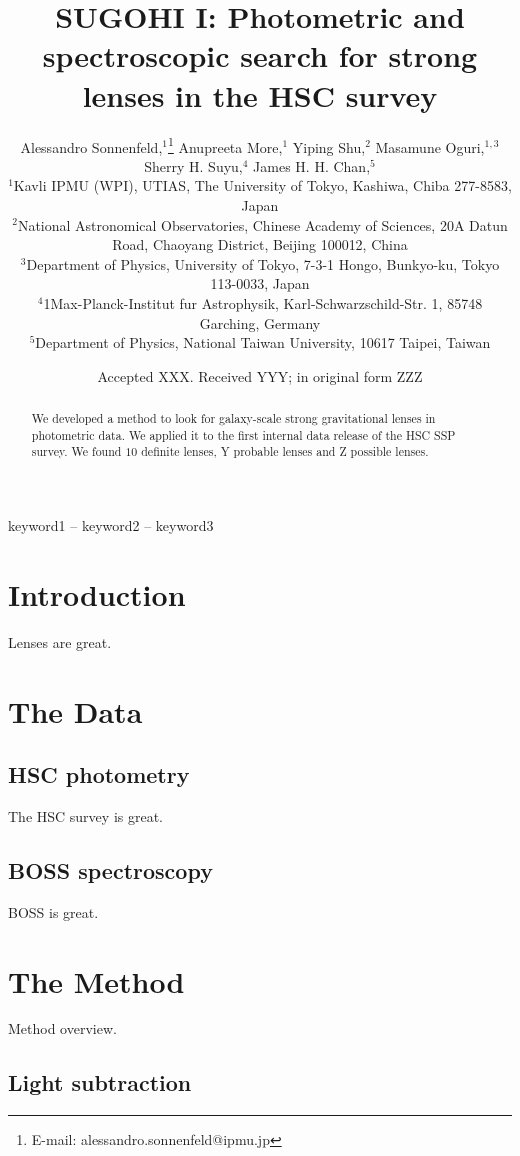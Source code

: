 \documentclass[a4paper,fleqn,usenatbib]{mnras}
\title[]{SUGOHI I: Photometric and spectroscopic search for strong lenses in the HSC survey}
\author[A. Sonnenfeld et al.]{
Alessandro Sonnenfeld,$^{1}$\thanks{E-mail: alessandro.sonnenfeld@ipmu.jp}
Anupreeta More,$^{1}$
Yiping Shu,$^{2}$
Masamune Oguri,$^{1,3}$
Sherry H. Suyu,$^{4}$
James H. H. Chan,$^{5}$
\\
$^{1}$Kavli IPMU (WPI), UTIAS, The University of Tokyo, Kashiwa, Chiba 277-8583, Japan \\
$^{2}$National Astronomical Observatories, Chinese Academy of
Sciences, 20A Datun Road, Chaoyang District, Beijing 100012,
China \\
$^{3}$Department of Physics, University of Tokyo, 7-3-1 Hongo, Bunkyo-ku, Tokyo 113-0033, Japan \\
$^{4}$1Max-Planck-Institut fur Astrophysik, Karl-Schwarzschild-Str. 1, 85748 Garching, Germany \\
$^{5}$Department of Physics, National Taiwan University, 10617 Taipei, Taiwan
}
\date{Accepted XXX. Received YYY; in original form ZZZ}
\def\ngradeA{10}
\begin{document}
\label{firstpage}
\pagerange{\pageref{firstpage}--\pageref{lastpage}}
\maketitle

\begin{abstract}
We developed a method to look for galaxy-scale strong gravitational lenses in photometric data. We applied it to the first internal data release of the HSC SSP survey. We found $\ngradeA$ definite lenses, Y probable lenses and Z possible lenses.
\end{abstract}

\begin{keywords}
keyword1 -- keyword2 -- keyword3
\end{keywords}



\section{Introduction}

Lenses are great.

\section{The Data}

\subsection{HSC photometry}
The HSC survey is great.

\subsection{BOSS spectroscopy}
BOSS is great.

\section{The Method}

Method overview.

\subsection{Light subtraction}
\end{document}

